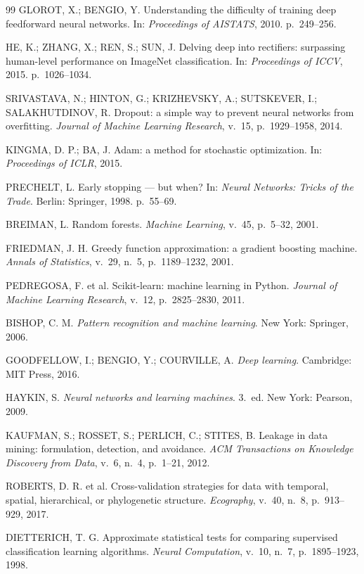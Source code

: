 \documentclass[12pt,a4paper]{article}
\theoremstyle{definition}
\theoremstyle{plain}
\theoremstyle{remark}
\begin{document}
\begin{thebibliography}{99}
GLOROT, X.; BENGIO, Y. Understanding the difficulty of training deep feedforward neural
networks. In: \emph{Proceedings of AISTATS}, 2010. p.~249--256.

HE, K.; ZHANG, X.; REN, S.; SUN, J. Delving deep into rectifiers: surpassing human-level
performance on ImageNet classification. In: \emph{Proceedings of ICCV}, 2015. p.~1026--1034.

SRIVASTAVA, N.; HINTON, G.; KRIZHEVSKY, A.; SUTSKEVER, I.; SALAKHUTDINOV, R. Dropout: a simple
way to prevent neural networks from overfitting. \emph{Journal of Machine Learning Research},
v.~15, p.~1929--1958, 2014.

KINGMA, D. P.; BA, J. Adam: a method for stochastic optimization.
In: \emph{Proceedings of ICLR}, 2015.

PRECHELT, L. Early stopping --- but when?
In: \emph{Neural Networks: Tricks of the Trade}. Berlin: Springer, 1998. p.~55--69.

BREIMAN, L. Random forests. \emph{Machine Learning}, v.~45, p.~5--32, 2001.

FRIEDMAN, J. H. Greedy function approximation: a gradient boosting machine.
\emph{Annals of Statistics}, v.~29, n.~5, p.~1189--1232, 2001.

PEDREGOSA, F. et al. Scikit-learn: machine learning in Python.
\emph{Journal of Machine Learning Research}, v.~12, p.~2825--2830, 2011.

BISHOP, C. M. \emph{Pattern recognition and machine learning}. New York: Springer, 2006.

GOODFELLOW, I.; BENGIO, Y.; COURVILLE, A. \emph{Deep learning}. Cambridge: MIT Press, 2016.

HAYKIN, S. \emph{Neural networks and learning machines}. 3.~ed. New York: Pearson, 2009.

KAUFMAN, S.; ROSSET, S.; PERLICH, C.; STITES, B. Leakage in data mining: formulation, detection,
and avoidance. \emph{ACM Transactions on Knowledge Discovery from Data}, v.~6, n.~4, p.~1--21, 2012.

ROBERTS, D. R. et al. Cross-validation strategies for data with temporal, spatial, hierarchical,
or phylogenetic structure. \emph{Ecography}, v.~40, n.~8, p.~913--929, 2017.

DIETTERICH, T. G. Approximate statistical tests for comparing supervised classification learning
algorithms. \emph{Neural Computation}, v.~10, n.~7, p.~1895--1923, 1998.


\end{thebibliography}
\end{document}
